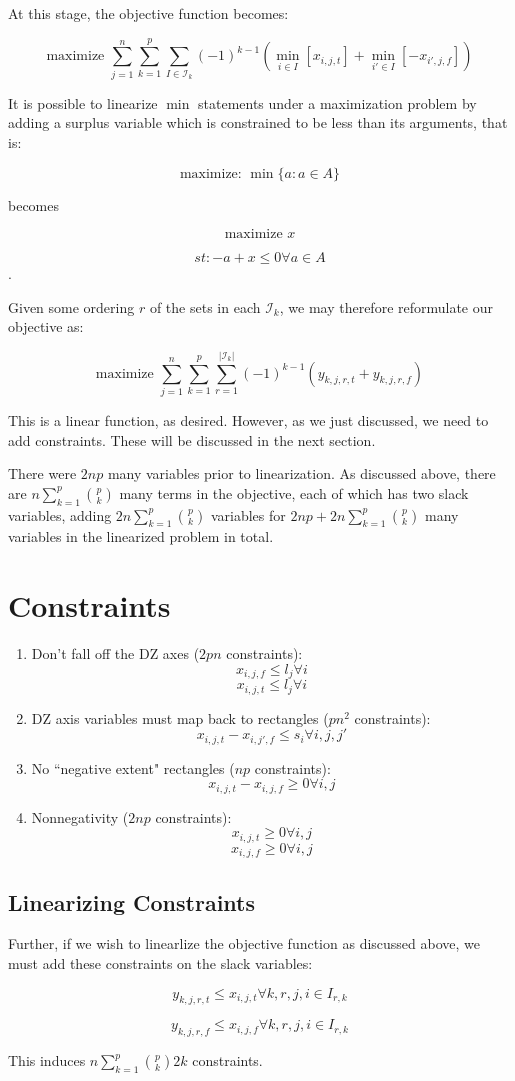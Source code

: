 \documentclass[a4paper]{article}
\begin{document}
At this stage, the objective function becomes:

$$\textrm{maximize }\sum_{j=1}^n\sum_{k=1}^{p} \sum_{I \in \mathcal{I}_k} 
(-1)^{k-1}(\min_{i \in I} [x_{i,j,t}] + \min_{i' \in I} [-x_{i',j,f}])$$

It is possible to linearize $\min$ statements under a maximization problem by adding a surplus variable which is constrained to be less than its arguments, that is:

$$\textrm{maximize: } \min\{a : a \in A\}$$

becomes

$$\textrm{maximize } x$$

$$st: - a + x \leq 0 \forall a \in A$$.

Given some ordering $r$ of the sets in each $\mathcal{I}_k$, we may therefore reformulate our objective as:


$$\textrm{maximize }\sum_{j=1}^n\sum_{k=1}^{p} \sum_{r=1}^{|\mathcal{I}_k|}
(-1)^{k-1} (y_{k,j,r,t} + y_{k,j,r,f})$$

This is a linear function, as desired. However, as we just discussed, we need to add constraints. These will be discussed in the next section.

There were $2np$ many variables prior to linearization. As discussed above, there are $n\sum_{k=1}^p {p \choose k}$ many terms in the objective, each of which has two slack variables, adding $2n \sum_{k=1}^p {p \choose k}$ variables for $2np + 2n\sum_{k=1}^p {p \choose k}$ many variables in the linearized problem in total.

\section{Constraints}

\begin{enumerate}
    \item Don't fall off the DZ axes ($2pn$ constraints):
        $$x_{i,j,f} \leq l_j \forall i$$
        $$x_{i,j,t} \leq l_j \forall i$$
    \item DZ axis variables must map back to rectangles ($pn^2$ constraints):
        $$x_{i,j,t} - x_{i,j',f} \leq s_i \forall i,j,j'$$
    \item No ``negative extent" rectangles ($np$ constraints):
        $$x_{i,j,t} - x_{i,j,f} \geq 0 \forall i,j$$
    \item Nonnegativity ($2np$ constraints):
        $$x_{i,j,t} \geq 0 \forall i,j$$
        $$x_{i,j,f} \geq 0 \forall i,j$$
\end{enumerate}

\subsection{Linearizing Constraints}

Further, if we wish to linearlize the objective function as discussed above, we must add these constraints on the slack variables:

$$y_{k,j,r,t} \leq x_{i,j,t} \forall k,r,j,i \in I_{r,k}$$

$$y_{k,j,r,f} \leq x_{i,j,f} \forall k,r,j,i \in I_{r,k}$$

This induces $n \sum_{k=1}^{p} {p\choose k} 2k$ constraints.
\end{document}
